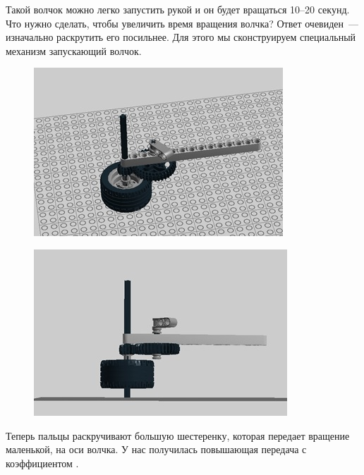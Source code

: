Такой волчок можно легко запустить  рукой и он будет вращаться  10--20 секунд. Что нужно сделать, чтобы увеличить время вращения волчка? Ответ очевиден~--- изначально раскрутить его посильнее. Для этого мы сконструируем специальный механизм запускающий волчок.
\clearpage
\begin{figure}[h!]
	\begin{center}
		\includegraphics[width=0.9\linewidth]{chapters/chapter6/images/7}
		\caption{}
		\label{ris:image6x7}
	\end{center}
\end{figure}
\begin{figure}[h!]
	\begin{center}
		\includegraphics[width=0.9\linewidth]{chapters/chapter6/images/8}
		\caption{}
		\label{ris:image6x8}
	\end{center}
\end{figure}

Теперь пальцы раскручивают большую шестеренку, которая передает вращение маленькой, на оси волчка. У нас получилась повышающая передача с коэффициентом .

